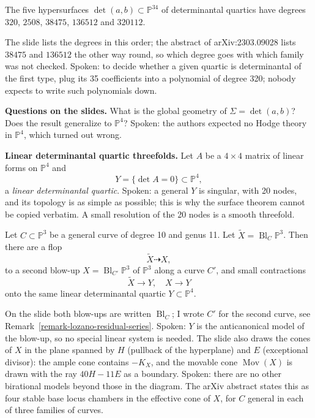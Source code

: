 \begin{theorem}
\label{theorem-lvl-degrees}
The five hypersurfaces
$\operatorname{det}(a,b) \subset
\mathbb{P}^{34}$ of determinantal quartics
have degrees $320$, $2508$, $38475$,
$136512$ and $320112$.
\end{theorem}

The slide lists the degrees in this order;
the abstract of arXiv:2303.09028 lists
$38475$ and $136512$ the other way round, so
which degree goes with which family was not
checked. Spoken: to decide whether a given
quartic is determinantal of the first type,
plug its 35 coefficients into a polynomial
of degree 320; nobody expects to write such
polynomials down.

\medskip\noindent
{\bf Questions on the slides.} What is the
global geometry of
$\Sigma = \operatorname{det}(a,b)$? Does the
result generalize to $\mathbb{P}^4$?
Spoken: the authors expected no Hodge theory
in $\mathbb{P}^4$, which turned out wrong.

\medskip\noindent
{\bf Linear determinantal quartic
threefolds.} Let $A$ be a $4 \times 4$
matrix of linear forms on $\mathbb{P}^4$ and
$$
Y = \{ \det A = 0 \} \subset \mathbb{P}^4,
$$
a \emph{linear determinantal quartic}.
Spoken: a general $Y$ is singular, with 20
nodes, and its topology is as simple as
possible; this is why the surface theorem
cannot be copied verbatim. A small resolution
of the 20 nodes is a smooth threefold.

\begin{theorem}
\label{theorem-lvl-quartic-threefolds}
Let $C \subset \mathbb{P}^3$ be a general
curve of degree 10 and genus 11. Let
$\widetilde{X} = \operatorname{Bl}_C
\mathbb{P}^3$. Then there are a flop
$$
\widetilde{X} \dashrightarrow X,
$$
to a second blow-up
$X = \operatorname{Bl}_{C'}\mathbb{P}^3$ of
$\mathbb{P}^3$ along a curve $C'$, and small
contractions
$$
\widetilde{X} \to Y,
\quad
X \to Y
$$
onto the same linear determinantal quartic
$Y \subset \mathbb{P}^4$.
\end{theorem}

On the slide both blow-ups are written
$\operatorname{Bl}_C$; I wrote $C'$ for the
second curve, see
Remark~\ref{remark-lozano-residual-series}.
Spoken: $Y$ is the anticanonical model of
the blow-up, so no special linear system is
needed. The slide also draws the cones of
$X$ in the plane spanned by $H$ (pullback of
the hyperplane) and $E$ (exceptional
divisor): the ample cone contains $-K_X$,
and the movable cone $\operatorname{Mov}(X)$
is drawn with the ray $40H - 11E$ as a
boundary. Spoken: there are no other
birational models beyond those in the
diagram. The arXiv abstract states this as
four stable base locus chambers in the
effective cone of $X$, for $C$ general in
each of three families of curves.

